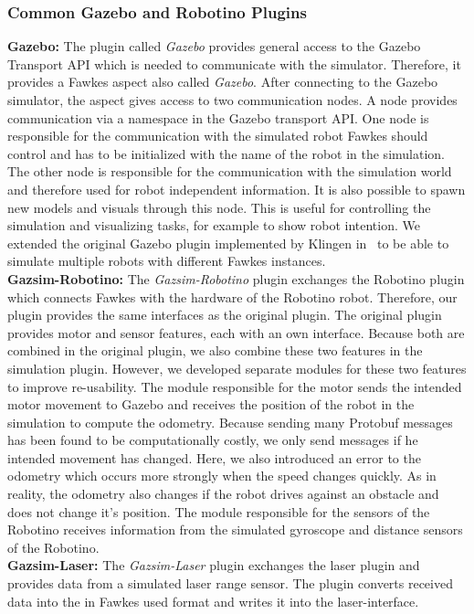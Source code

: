 \subsubsection{Common Gazebo and Robotino Plugins}
\textbf{Gazebo:} The plugin called \textit{Gazebo} provides general access to the Gazebo Transport API which is needed to communicate with the simulator. Therefore, it provides a Fawkes aspect also called \textit{Gazebo}. After connecting to the Gazebo simulator, the aspect gives access to two communication nodes. A node provides communication via a namespace in the Gazebo transport API. One node is responsible for the communication with the simulated robot Fawkes should control and has to be initialized with the name of the robot in the simulation. The other node is responsible for the communication with the simulation world and therefore used for robot independent information. It is also possible to spawn new models and visuals through this node. This is useful for controlling the simulation and visualizing tasks, for example to show robot intention. We extended the original Gazebo plugin implemented by Klingen in~\cite{KlingenDA} to be able to simulate multiple robots with different Fawkes instances.
\\
\textbf{Gazsim-Robotino:}
The \textit{Gazsim-Robotino} plugin exchanges the Robotino plugin which connects Fawkes with the hardware of the Robotino robot. Therefore, our plugin provides the same interfaces as the original plugin. The original plugin provides motor and sensor features, each with an own interface. Because both are combined in the original plugin, we also combine these two features in the simulation plugin. However, we developed separate modules for these two features to improve re-usability. The module responsible for the motor sends the intended motor movement to Gazebo and receives the position of the robot in the simulation to compute the odometry. Because sending many Protobuf messages has been found to be computationally costly, we only send messages if he intended movement has changed. Here, we also introduced an error to the odometry which occurs more strongly when the speed changes quickly. As in reality, the odometry also changes if the robot drives against an obstacle and does not change it's position. The module responsible for the sensors of the Robotino receives information from the simulated gyroscope and distance sensors of the Robotino.
\\
\textbf{Gazsim-Laser:}
The \textit{Gazsim-Laser} plugin exchanges the laser plugin and provides data from a simulated laser range sensor. The plugin converts received data into the in Fawkes used format and writes it into the laser-interface.
